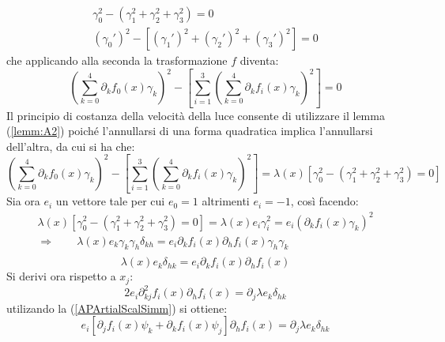\begin{equation*}
    \begin{gathered}
        \gamma_0^2-(\gamma_1^2+\gamma_2^2+\gamma_3^2)=0\\
        (\gamma_0')^2-[(\gamma_1')^2+(\gamma_2')^2+(\gamma_3')^2]=0
    \end{gathered}
\end{equation*}
che applicando alla seconda la trasformazione $f$ diventa:
\begin{equation*}
    \left(\sum_{k=0}^4\partial_kf_0(x)\gamma_k\right)^2-\left[\sum_{i=1}^3\left(\sum_{k=0}^4\partial_kf_i(x)\gamma_k\right)^2\right]=0
\end{equation*}
Il principio di costanza della velocità della luce consente di utilizzare il lemma (\ref{lemm:A2}) poiché l'annullarsi di una
 forma quadratica implica l'annullarsi dell'altra, da cui si ha che:
\begin{equation*}
    \left(\sum_{k=0}^4\partial_kf_0(x)\gamma_k\right)^2-\left[\sum_{i=1}^3\left(\sum_{k=0}^4\partial_kf_i(x)\gamma_k\right)^2\right]=
    \lambda(x)\left[\gamma_0^2-(\gamma_1^2+\gamma_2^2+\gamma_3^2)=0\right]
\end{equation*}
Sia ora $e_i$ un vettore tale per cui $e_0=1$ altrimenti $e_i=-1$, così facendo:
\begin{equation*}
    \begin{gathered}
        \lambda(x)\left[\gamma_0^2-(\gamma_1^2+\gamma_2^2+\gamma_3^2)=0\right]= \lambda(x)e_i\gamma_i^2
        =e_i\left(\partial_kf_i(x)\gamma_k\right)^2\\
        \Rightarrow \qquad \lambda(x)e_k\gamma_k\gamma_h\delta_{kh}=e_i\partial_kf_i(x)\partial_hf_i(x)\gamma_h\gamma_k\\
    \end{gathered}
\end{equation*}
\begin{equation}
    \lambda(x)e_k\delta_{hk}=e_i\partial_kf_i(x)\partial_hf_i(x)
    \label{APartialDelta}
\end{equation}
Si derivi ora rispetto a $x_j$:
\begin{equation*}
    2e_i\partial_{kj}^2f_i(x)\partial_hf_i(x)=\partial_j\lambda e_k \delta_{hk}
\end{equation*}
utilizando la (\ref{APArtialScalSimm}) si ottiene:
\begin{equation}
   e_i\left[\partial_jf_i(x)\psi_k+\partial_kf_i(x)\psi_j\right]\partial_hf_i(x)=\partial_j\lambda e_k\delta_{hk}
\end{equation}    
